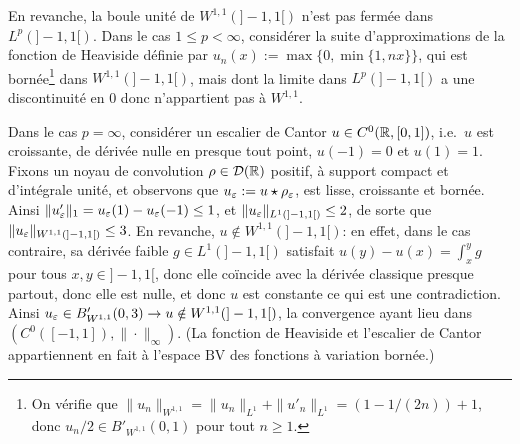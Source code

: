 En revanche, la boule unité de $W^{1,1}(]-1,1[)$ n'est pas fermée dans $L^p(]-1,1[)$. Dans le cas $1 \leq p < \infty$, considérer la suite d'approximations de la fonction de Heaviside définie par $u_n(x) := \max\{0,\min\{1,n x\}\}$, qui est bornée\footnote{
On vérifie que $\|u_n\|_{W^{1,1}} = \|u_n\|_{L^1} + \|u'_n\|_{L^1} = (1-1/(2n)) + 1$, donc $u_n/2 \in B'_{W^{1,1}}(0,1)$ pour tout $n \geq 1$.
} dans $W^{1,1}(]-1,1[)$, mais dont la limite dans $L^p(]-1,1[)$ a une discontinuité en $0$ donc n'appartient pas à $W^{1,1}$. 

Dans le cas $p = \infty$, considérer un escalier de Cantor $u\in C^0(\mathbb{R},[0,1])$, i.e.\ $u$ est croissante, de dérivée nulle en presque tout point, $u(-1)=0$ et $u(1)=1$. 
Fixons un noyau de convolution $\rho \in \mathcal{D}(\mathbb{R})$ positif, à support compact et d'intégrale unité, et observons que $u_\varepsilon := u\star \rho_\varepsilon$, est lisse, croissante et bornée. Ainsi $\|u'_\varepsilon\|_1 = u_\varepsilon(1)-u_\varepsilon(-1) \leq 1$, et $\|u_\varepsilon\|_{L^1(]-1,1[)} \leq 2$, de sorte que $\|u_\varepsilon\|_{W^{1,1}(]-1,1[)} \leq 3$. En revanche, $u\notin  W^{1,1}(]-1,1[)$: en effet, dans le cas contraire, sa dérivée faible $g\in L^1(]-1,1[)$ satisfait $u(y)-u(x) = \int_x^y g$ pour tous $x,y \in ]-1,1[$, donc elle coïncide avec la dérivée classique presque partout, donc elle est nulle, et donc $u$ est constante ce qui est une contradiction. Ainsi $u_\varepsilon \in B'_{W^{1,1}}(0,3) \to u\notin W^{1,1}(]-1,1[)$, la convergence ayant lieu dans $(C^0([-1,1]), \|\cdot\|_\infty)$. 
(La fonction de Heaviside et l'escalier de Cantor appartiennent en fait à l'espace $\mathrm{BV}$ des fonctions à variation bornée.) 
